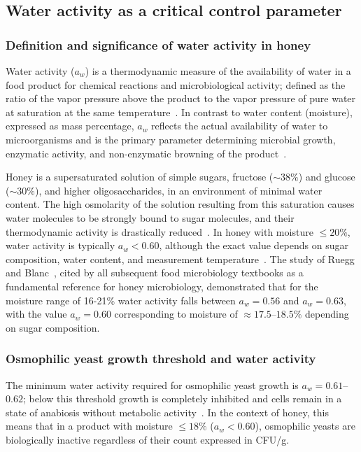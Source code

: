 \subsection{Water activity as a critical control parameter}

\subsubsection{Definition and significance of water activity in honey}

Water activity ($a_w$) is a thermodynamic measure of the
availability of water in a food product for chemical reactions
and microbiological activity; defined as the ratio of the vapor
pressure above the product to the vapor pressure of pure water
at saturation at the same
temperature~\cite{waaw2006}.
In contrast to water content (moisture), expressed as mass
percentage, $a_w$ reflects the actual availability of water to
microorganisms and is the primary parameter determining microbial
growth, enzymatic activity, and non-enzymatic browning of the
product~\cite{waaw2006}.

Honey is a supersaturated solution of simple sugars, fructose
($\sim 38\%$) and glucose ($\sim 30\%$), and higher
oligosaccharides, in an environment of minimal water content.
The high osmolarity of the solution resulting from this saturation
causes water molecules to be strongly bound to sugar molecules,
and their thermodynamic activity is drastically
reduced~\cite{zamora2006,waaw2006}. In honey with moisture
$\leq 20\%$, water activity is typically $a_w < 0.60$,
although the exact value depends on sugar composition, water
content, and measurement temperature~\cite{ruegg1981,gleiter2006}.
The study of Ruegg and Blanc~\cite{ruegg1981}, cited by all
subsequent food microbiology textbooks as a fundamental reference
for honey microbiology, demonstrated that for the moisture range
of 16-21\% water activity falls between $a_w = 0.56$ and
$a_w = 0.63$, with the value $a_w = 0.60$ corresponding to
moisture of $\approx 17.5$--$18.5\%$ depending on sugar
composition.

\subsubsection{Osmophilic yeast growth threshold and water activity}

The minimum water activity required for osmophilic yeast growth
is $a_w = 0.61$--$0.62$; below this threshold growth is
completely inhibited and cells remain in a state of anabiosis
without metabolic activity~\cite{ruegg1981,alwaili2012}.
In the context of honey, this means that in a product with moisture
$\leq 18\%$ ($a_w < 0.60$), osmophilic yeasts are biologically
inactive regardless of their count expressed in CFU/g.

